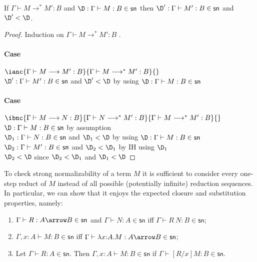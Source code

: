 \documentclass{article}
\newcommand{\csn}{\mathsf{sn}}
\newcommand{\mred}{\longrightarrow^*}
\newcommand{\red}{\longrightarrow}
\begin{document}
 \begin{lemma}\label{lm:mredsn}
If  $\Gamma \vdash M \mred M' : B$ and
   $\D:\Gamma \vdash M : B \in \csn$ then $\D':\Gamma \vdash M' : B \in \csn$ and $\D' < \D$.
 \end{lemma}
 \begin{proof}
Induction on $\Gamma \vdash M\mred M' : B$ .

\paragraph{Case} $\ianc{\Gamma \vdash M \red M' : B}{\Gamma \vdash M \mred M' : B}{} \qquad$
\\[1em]
$\D' : \Gamma \vdash M' : B \in \csn$ and $\D' < \D$ \hfill by using $\D:\Gamma \vdash M : B \in \csn$

\paragraph{Case} $ \ibnc{\Gamma \vdash M \red N : B}{\Gamma \vdash N \mred M' : B}
      {\Gamma \vdash M \mred M' : B}{}$
\\[1em]
$\D : \Gamma \vdash M : B \in \csn$ \hfill by assumption\\
$\D_1 : \Gamma \vdash N : B \in \csn$ and $\D_1 < \D$ \hfill by using $\D: \Gamma \vdash M : B \in \csn$\\
$\D_2 : \Gamma \vdash M' : B \in \csn$ and $\D_2 < \D_1$ \hfill by IH using $\D_1$ \\
$\D_2 < \D$ \hfill since $\D_2 < \D_1$ and $\D_1 < \D$

 \end{proof}

To check strong normalizability of a term $M$ it is sufficient to consider every one-step
reduct of $M$ instead of all possible (potentially infinite) reduction sequences. In particular, we can show that it enjoys the expected closure and substitution properties, namely:
\begin{enumerate}
\item $\Gamma \vdash R : A \arrow B \in \csn$ and $\Gamma \vdash N : A \in \csn$
    iff $\Gamma \vdash R~N : B \in \csn$;
  \item $\Gamma, x{:}A \vdash M : B \in \csn$ iff $\Gamma \vdash  \lambda x{:}A.M : A \arrow B \in \csn$;
  \item Let  $\Gamma \vdash R : A \in
   \csn$. Then $\Gamma, x{:}A \vdash M : B \in \csn$ if $\Gamma \vdash [R/x]M : B \in \csn$.
\end{enumerate}
\end{document}
